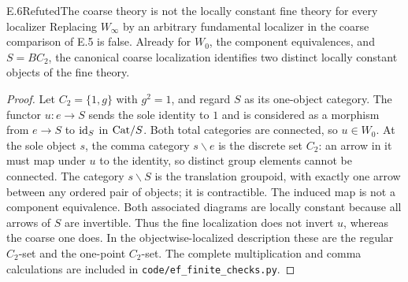 \begin{claim}{E.6}{Refuted}{The coarse theory is not the locally constant fine theory for every localizer}
Replacing $W_\infty$ by an arbitrary fundamental localizer in the coarse comparison of E.5 is false. Already for $W_0$, the component equivalences, and $S=BC_2$, the canonical coarse localization identifies two distinct locally constant objects of the fine theory.
\end{claim}
\begin{proof}
Let $C_2=\{1,g\}$ with $g^2=1$, and regard $S$ as its one-object category. The functor $u:e\to S$ sends the sole identity to $1$ and is considered as a morphism from $e\to S$ to $\mathrm{id}_S$ in $\mathrm{Cat}/S$. Both total categories are connected, so $u\in W_0$. At the sole object $s$, the comma category $s\backslash e$ is the discrete set $C_2$: an arrow in it must map under $u$ to the identity, so distinct group elements cannot be connected. The category $s\backslash S$ is the translation groupoid, with exactly one arrow between any ordered pair of objects; it is contractible. The induced map is not a component equivalence. Both associated diagrams are locally constant because all arrows of $S$ are invertible. Thus the fine localization does not invert $u$, whereas the coarse one does. In the objectwise-localized description these are the regular $C_2$-set and the one-point $C_2$-set. The complete multiplication and comma calculations are included in \texttt{code/ef\_finite\_checks.py}.
\end{proof}

